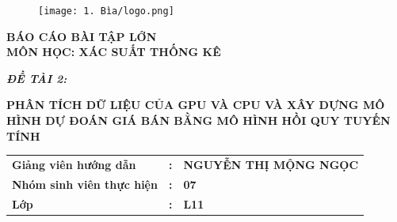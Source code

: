 \documentclass[a4paper]{article}
\begin{document}
\begin{titlepage}
        \begin{figure}[H]
            \centering
            \texttt{[image: 1. Bìa/logo.png]}
        \end{figure}
        
        \vspace{-1.2cm}
        \begin{center}
            \fontsize{17pt}{15pt}\selectfont
            \textbf{BÁO CÁO BÀI TẬP LỚN}\\
            \vspace{0.2cm}
            \textbf{MÔN HỌC: XÁC SUẤT THỐNG KÊ}\\[1.1cm]
            \end{center}
        
        \begin{flushleft}
            \fontsize{17pt}{15pt}\selectfont  
            \textbf{\textsl{ĐỀ TÀI 2:}}
        \end{flushleft}

        \vspace{-0.4cm}
        \begin{center}
            \fontsize{17pt}{22pt}\selectfont 
            \textbf{\textrm{PHÂN TÍCH DỮ LIỆU CỦA GPU VÀ CPU VÀ XÂY DỰNG MÔ HÌNH DỰ ĐOÁN GIÁ BÁN BẰNG MÔ HÌNH HỒI QUY TUYẾN TÍNH}}
        \end{center}

        \vspace{0.7cm}

        \begin{table}[h]
            \centering
            \setlength{\extrarowheight}{10pt}
            \begin{tabular}{lll}
                 \textbf{Giảng viên hướng dẫn} & \textbf{:} & \textbf{NGUYỄN THỊ MỘNG NGỌC}\\
                 \textbf{Nhóm sinh viên thực hiện} & \textbf{:} & \textbf{07}\\
                 \textbf{Lớp} & \textbf{:} & \textbf{L11}
            \end{tabular}
        \end{table}


\end{titlepage}
\end{document}
